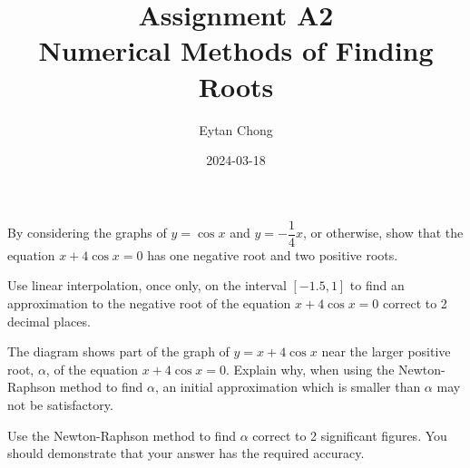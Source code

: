 \documentclass{echw}
\title{Assignment A2\\Numerical Methods of Finding Roots}
\author{Eytan Chong}
\date{2024-03-18}
\begin{document}
    \problem{}
        By considering the graphs of $y = \cos x$ and $y = -\dfrac14 x$, or otherwise, show that the equation $x + 4\cos x = 0$ has one negative root and two positive roots.

        Use linear interpolation, once only, on the interval $[-1.5, 1]$ to find an approximation to the negative root of the equation $x + 4\cos x = 0$ correct to 2 decimal places.

        \begin{center}
        \end{center}

        The diagram shows part of the graph of $y = x + 4\cos x$ near the larger positive root, $\alpha$, of the equation $x + 4\cos x = 0$. Explain why, when using the Newton-Raphson method to find $\alpha$, an initial approximation which is smaller than $\alpha$ may not be satisfactory.

        Use the Newton-Raphson method to find $\alpha$ correct to 2 significant figures. You should demonstrate that your answer has the required accuracy.
\end{document}
